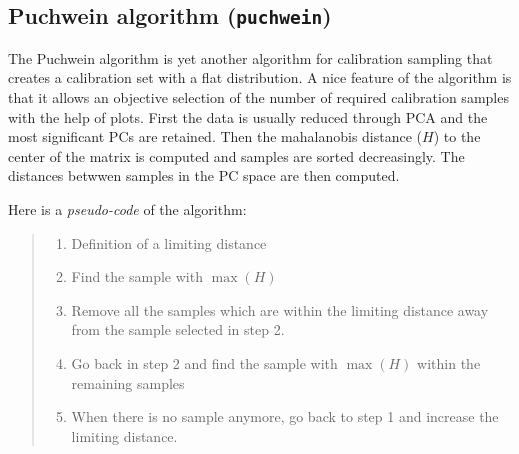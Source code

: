 \documentclass[12pt]{article}\usepackage{graphicx, color}
\newcommand{\Rfunction}[1]{{\texttt{#1}}}
\begin{document}
\subsection{Puchwein algorithm (\Rfunction{puchwein})}

The Puchwein algorithm is yet another algorithm for calibration sampling \cite{puchwein1988} that creates a calibration set with a flat distribution. A nice feature of the algorithm is that it allows an objective selection of the number of required calibration samples with the help of plots. First the data is usually reduced through PCA and the most significant PCs are retained. Then the mahalanobis distance ($H$) to the center of the matrix is computed and samples are sorted decreasingly. The distances betwwen samples in the PC space are then computed.

Here is a \emph{pseudo-code} of the algorithm:

\begin{quote}
\begin{enumerate}
  \item Definition of a limiting distance
  \item Find the sample with $\max(H)$
  \item Remove all the samples which are within the limiting distance away from the sample selected in step 2.
  \item Go back in step 2 and find the sample with $\max(H)$ within the remaining samples
  \item When there is no sample anymore, go back to step 1 and increase the limiting distance.
\end{enumerate}
\end{quote}
\end{document}

